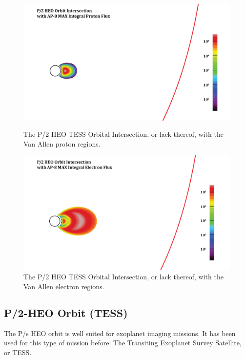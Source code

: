 \documentclass[11pt]{article}
\begin{document}
\begin{figure}[H]
    \centering
    \begin{minipage}{\dimexpr.5\textwidth-1em}
        \centering
        \includegraphics[width=1\linewidth]{TESS_PFlux.png}
        \caption{The P/2 HEO TESS Orbital Intersection, or lack thereof, with the Van Allen proton regions.}
        \label{fig:TESS_Pflux}
    \end{minipage}\hfill
    \begin{minipage}{\dimexpr.5\textwidth-1em}
        \centering
        \includegraphics[width=1\linewidth]{TESS_EFlux.png}
        \caption{The P/2 HEO TESS Orbital Intersection, or lack thereof, with the Van Allen electron regions.}
        \label{fig:TESS_Eflux}
    \end{minipage}
\end{figure}

\subsection{P/2-HEO Orbit (TESS)}
The P/s HEO orbit is well suited for exoplanet imaging missions. It has been used for this type of mission before: The Transiting Exoplanet Survey Satellite, or TESS.
\end{document}
